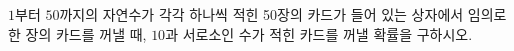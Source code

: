 $1$부터 $50$까지의 자연수가 각각 하나씩 적힌 50장의 카드가 들어 있는 상자에서 임의로 한 장의 카드를 꺼낼 때, $10$과 서로소인 수가 적힌 카드를 꺼낼 확률을 구하시오.
